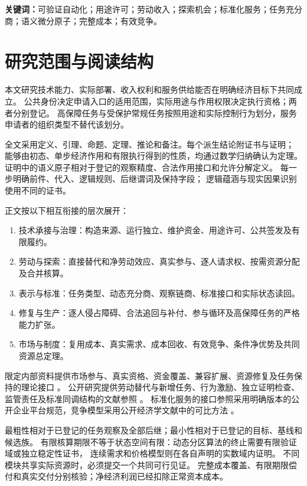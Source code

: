 \documentclass[UTF8,12pt,a4paper,openany,fontset=none,zihao=false]{ctexrep}
\theoremstyle{definition}
\newcommand{\1}{\mathbf 1}
\begin{document}
\textbf{关键词：}可验证自动化；用途许可；劳动收入；探索机会；标准化服务；任务充分商；语义微分原子；完整成本；有效竞争。

\chapter*{研究范围与阅读结构}

本文研究技术能力、实际部署、收入权利和服务供给能否在明确经济目标下共同成立。
公共身份决定申请入口的适用范围，实际用途与作用权限决定执行资格；两者分别登记。
高保障任务与受保护常规任务按照用途和实际控制行为划分，服务申请者的组织类型不替代该划分。

全文采用定义、引理、命题、定理、推论和备注。每个派生结论附证书与证明；
能够由初态、单步经济作用和有限执行得到的性质，均通过数学归纳确认为定理。
证明中的语义原子相对于登记的观察精度、合法作用接口和允许分解定义。
每一步明确前件、代入、逻辑规则、后继谓词及保持字段；
逻辑蕴涵与现实因果识别使用不同的证书。

正文按以下相互衔接的层次展开：
\begin{enumerate}
\item 技术承接与治理：构造来源、运行独立、维护资金、用途许可、公共签发及有限履约。
\item 劳动与探索：直接替代和净劳动效应、真实参与、逐人请求权、按需资源分配及合并核算。
\item 表示与标准：任务类型、动态充分商、观察链商、标准接口和实际状态读回。
\item 修复与生产：逐人侵占障碍、合法追回与补付、参与循环及高保障任务的严格能力扩张。
\item 市场与制度：复用成本、真实需求、成本回收、有效竞争、条件净优势及共同资源总定理。
\end{enumerate}

限定内部资料提供市场参与、真实资格、资金覆盖、兼容扩展、资源修复及任务保持的理论接口
\cite{InternalEconomics,InternalTheory}。
公开研究提供劳动替代与新增任务、行为激励、独立证明检查、监管责任及标准同调结构的文献参照
\cite{AcemogluRestrepo2019,Autor2015,Becker1968,Necula1997,IAEACNS,Hatcher2002}。
标准化服务的接口参照采用明确版本的公开企业平台规范，竞争模型采用公开经济学文献中的可比方法
\cite{JakartaPlatform11,KatzShapiro1994,Hotelling1929}。

最粗性相对于已登记的任务观察及全部后继；最小性相对于已登记的目标、基线和候选族。
有限核算期限不等于状态空间有限：动态分区算法的终止需要有限验证域或独立稳定性证书，
连续需求和价格模型则在各自声明的实数域内证明。
不同模块共享实际资源时，必须提交一个共同可行见证。
完整成本覆盖、有限期限偿付和真实交付分别核验；净经济利润已经扣除正常资本成本。
\end{document}
